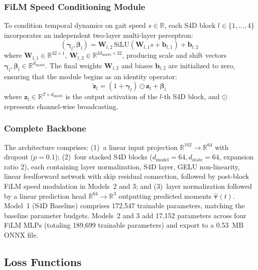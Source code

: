 \documentclass[journal]{IEEEtran}
\newcommand{\dmodel}{d_{\mathrm{model}}}
\begin{document}
\subsubsection{FiLM Speed Conditioning Module}
To condition temporal dynamics on gait speed $s \in \mathbb{R}$, each S4D block $l \in \{1, \dots, 4\}$ incorporates an independent two-layer multi-layer perceptron:
\begin{equation}
    (\boldsymbol{\gamma}_l, \boldsymbol{\beta}_l) = \mathbf{W}_{l,2} \, \mathrm{SiLU}(\mathbf{W}_{l,1} s + \mathbf{b}_{l,1}) + \mathbf{b}_{l,2}
    \label{eq:film_mlp}
\end{equation}
where $\mathbf{W}_{l,1} \in \mathbb{R}^{32 \times 1}$, $\mathbf{W}_{l,2} \in \mathbb{R}^{2\dmodel \times 32}$, producing scale and shift vectors $\boldsymbol{\gamma}_l, \boldsymbol{\beta}_l \in \mathbb{R}^{\dmodel}$. The final weights $\mathbf{W}_{l,2}$ and biases $\mathbf{b}_{l,2}$ are initialized to zero, ensuring that the module begins as an identity operator:
\begin{equation}
    \tilde{\mathbf{z}}_l = (1 + \boldsymbol{\gamma}_l) \odot \mathbf{z}_l + \boldsymbol{\beta}_l
    \label{eq:film_modulation}
\end{equation}
where $\mathbf{z}_l \in \mathbb{R}^{T \times \dmodel}$ is the output activation of the $l$-th S4D block, and $\odot$ represents channel-wise broadcasting.

\subsubsection{Complete Backbone}
The architecture comprises: (1)~a linear input projection $\mathbb{R}^{102} \to \mathbb{R}^{64}$ with dropout ($p = 0.1$); (2)~four stacked S4D blocks ($d_{\mathrm{model}}=64, d_{\mathrm{state}}=64$, expansion ratio 2), each containing layer normalization, S4D layer, GELU non-linearity, linear feedforward network with skip residual connection, followed by post-block FiLM speed modulation in Models~2 and 3; and (3)~layer normalization followed by a linear prediction head $\mathbb{R}^{64} \to \mathbb{R}^3$ outputting predicted moments $\hat{\boldsymbol{\tau}}(t)$.
Model~1 (S4D Baseline) comprises 172,547 trainable parameters, matching the baseline parameter budgets. Models~2 and 3 add 17,152 parameters across four FiLM MLPs (totaling 189,699 trainable parameters) and export to a 0.53~MB ONNX file.

\subsection{Loss Functions}
\label{sec:loss}
\end{document}
